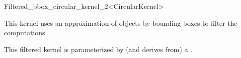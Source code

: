 \begin{ccRefClass}{Filtered_bbox_circular_kernel_2<CircularKernel>}

\ccDefinition

This kernel uses an approximation of objects by bounding boxes to filter the 
computations. 


\ccIsModel


\ccParameters

This filtered kernel is parameterized by (and derives from) a . 

\end{ccRefClass}
